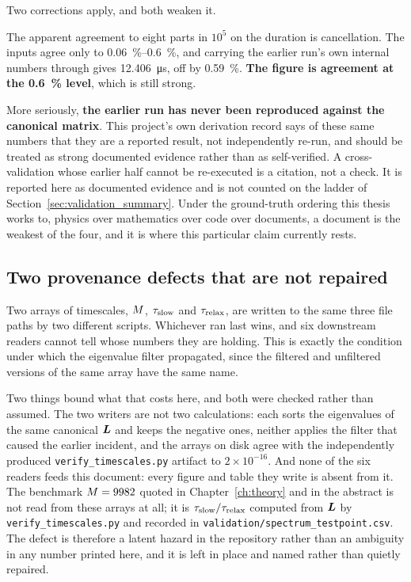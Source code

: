 Two corrections apply, and both weaken it.

The apparent agreement to eight parts in $10^{5}$ on the duration is
cancellation. The inputs agree only to \SIrange{0.06}{0.6}{\percent}, and
carrying the earlier run's own internal numbers through gives
\SI{12.406}{\micro\second}, off by \SI{0.59}{\percent}. \textbf{The figure is
agreement at the \SI{0.6}{\percent} level}, which is still strong.

More seriously, \textbf{the earlier run has never been reproduced against the
canonical matrix}. This project's own derivation record says of these same
numbers that they are a reported result, not independently re-run, and should be
treated as strong documented evidence rather than as self-verified. A
cross-validation whose earlier half cannot be re-executed is a citation, not a
check. It is reported here as documented evidence and is not counted on the
ladder of Section~\ref{sec:validation_summary}. Under the ground-truth ordering
this thesis works to, physics over mathematics over code over documents,
a document is the weakest of the four, and it is where this particular claim
currently rests.

\subsection{Two provenance defects that are not repaired}

Two arrays of timescales, $M$, $\tau_{\mathrm{slow}}$ and $\tau_{\mathrm{relax}}$, are written to the
same three file paths by two different scripts. Whichever ran last wins, and six
downstream readers cannot tell whose numbers they are holding. This is exactly
the condition under which the eigenvalue filter propagated, since the filtered
and unfiltered versions of the same array have the same name.

Two things bound what that costs here, and both were checked rather than
assumed. The two writers are not two calculations: each sorts the eigenvalues of
the same canonical $\bm{L}$ and keeps the negative ones, neither applies the
filter that caused the earlier incident, and the arrays on disk agree with the
independently produced \texttt{verify\_timescales.py} artifact to $2\times
10^{-16}$. And none of the six readers feeds this document: every figure and
table they write is absent from it. The benchmark $M = 9982$ quoted in
Chapter~\ref{ch:theory} and in the abstract is not read from these arrays at
all; it is $\tau_{\mathrm{slow}}/\tau_{\mathrm{relax}}$ computed from $\bm{L}$ by
\texttt{verify\_timescales.py} and recorded in
\texttt{validation/spectrum\_testpoint.csv}. The defect is therefore a latent
hazard in the repository rather than an ambiguity in any number printed here,
and it is left in place and named rather than quietly repaired.

